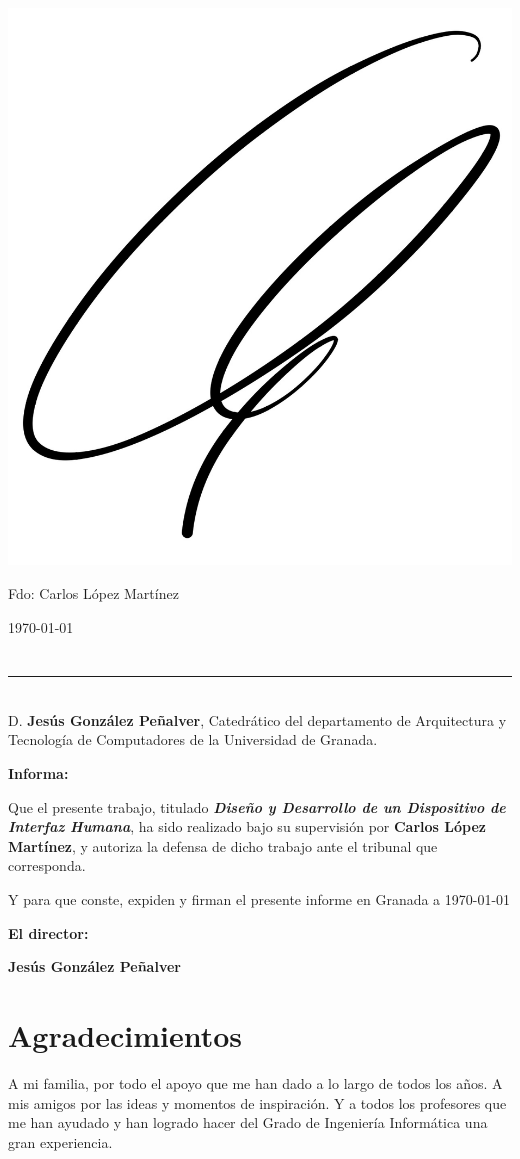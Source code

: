 \vspace{3cm}

\begin{flushleft}
       \hspace*{1.25cm}\includegraphics[width=0.2\linewidth]{prefacios/Firma.jpg}
\end{flushleft}
\noindent Fdo: Carlos López Martínez

\vspace{2cm}

\begin{flushright}
\today
\end{flushright}


\chapter*{}
\thispagestyle{empty}

\noindent\rule[-1ex]{\textwidth}{2pt}\\[4.5ex]

D. \textbf{Jesús González Peñalver}, Catedrático del departamento de Arquitectura y Tecnología de Computadores de la Universidad de Granada.

\vspace{0.5cm}

\textbf{Informa:}

\vspace{0.5cm}

Que el presente trabajo, titulado \textit{\textbf{Diseño y Desarrollo de un Dispositivo de Interfaz Humana}},
ha sido realizado bajo su supervisión por \textbf{Carlos López Martínez}, y autoriza la defensa de dicho trabajo ante el tribunal
que corresponda.

\vspace{0.5cm}

Y para que conste, expiden y firman el presente informe en Granada a \today

\vspace{1cm}

\textbf{El director:}

\vspace{5cm}

\noindent \textbf{Jesús González Peñalver}

\chapter*{Agradecimientos}
\thispagestyle{empty}

       \vspace{1cm}

A mi familia, por todo el apoyo que me han dado a lo largo de todos
los años. A mis amigos por las ideas y momentos de inspiración. Y a
todos los profesores que me han ayudado y han logrado hacer del Grado de
Ingeniería Informática una gran experiencia.